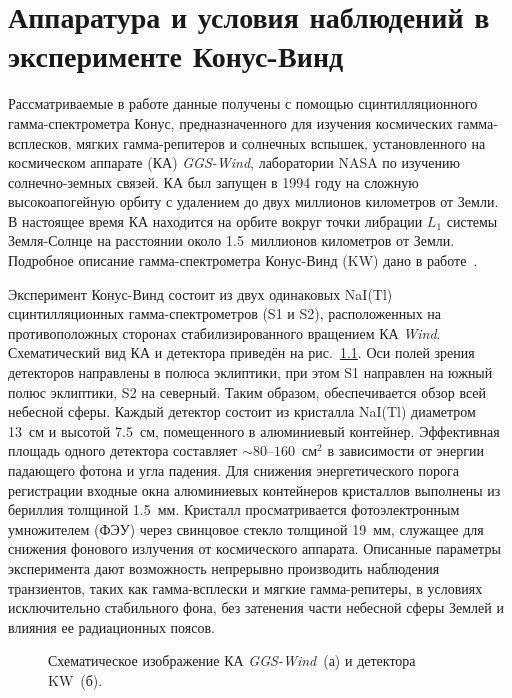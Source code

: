 \chapter{Аппаратура и условия наблюдений в эксперименте Конус-Винд}\label{KW_description}

Рассматриваемые в работе данные получены с помощью сцинтилляционного гамма-спектрометра 
Конус, предназначенного для изучения космических гамма-всплесков, мягких гамма-репитеров и солнечных вспышек,
установленного на космическом аппарате (КА) \textit{GGS-Wind}, лаборатории NASA по изучению 
солнечно-земных связей. КА был запущен в 1994 году на сложную высокоапогейную орбиту 
с удалением до двух миллионов километров от Земли. В настоящее время КА находится 
на орбите вокруг точки либрации $L_1$ системы Земля-Солнце на расстоянии около 1.5~миллионов километров от Земли.
Подробное описание гамма-спектрометра Конус-Винд (KW) дано в работе~\citep{Aptekar_1995SSR}.

Эксперимент Конус-Винд состоит из двух одинаковых NaI(Tl) сцинтилляционных 
гамма-спектрометров (S1 и S2), расположенных на противоположных сторонах 
стабилизированного вращением КА \textit{Wind}. 
Схематический вид КА и детектора приведён на рис.~\ref{img:KW_main_view}.
Оси полей зрения детекторов 
направлены в полюса эклиптики, при этом S1 направлен на южный полюс эклиптики, 
S2 на северный. Таким образом, обеспечивается обзор всей небесной сферы. 
Каждый детектор состоит из кристалла NaI(Tl) диаметром 13~см и высотой 7.5~см, 
помещенного в алюминиевый контейнер.
Эффективная площадь одного детектора составляет $\sim 80\textrm{--}160$~см$^2$ в 
зависимости от энергии падающего фотона и угла падения.  
Для снижения энергетического порога регистрации входные окна алюминиевых 
контейнеров кристаллов выполнены из бериллия толщиной 1.5~мм. 
Кристалл просматривается фотоэлектронным 
умножителем (ФЭУ) через свинцовое стекло толщиной 19~мм, служащее для снижения фонового 
излучения от космического аппарата. Описанные параметры эксперимента дают 
возможность непрерывно производить наблюдения транзиентов, таких как гамма-всплески 
и мягкие гамма-репитеры, в условиях исключительно стабильного фона, 
без затенения части небесной сферы Землей и влияния ее радиационных поясов. 

\begin{figure}[h]
  \begin{minipage}[h]{0.5\textwidth}
  \end{minipage}
  \hfill
  \begin{minipage}[h]{0.5\textwidth}
  \end{minipage}
  \caption[Схематическое изображение КА \textit{GGS-Wind} и детектора KW.]
  {Схематическое изображение КА \textit{GGS-Wind}~(а) и детектора KW~(б).}
  \label{img:KW_main_view}  
\end{figure}

